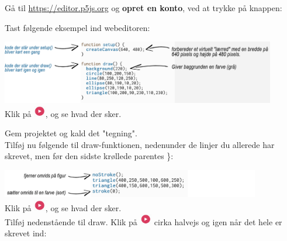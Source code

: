 \documentclass{ucph-handout}
\newcounter{handout}
\newcommand{\Ark}{Ark \#\arabic{handout} -- }
\begin{document}
\renewcommand{\Title}{\Ark Tegn med editor.p5js.org}

\begin{exercisebox}[adjusted title=Før vi rigtig starter]

Gå til \url{https://editor.p5js.org} og \textbf{opret en konto}, ved at trykke på knappen: 


\vspace{3mm}
Tast følgende eksempel ind webeditoren:

\vspace{3mm}
\quad\quad\includegraphics[width=0.90\textwidth]{nyebilleder/first.jpg} \\

Klik på \includegraphics[height=5mm]{ikoner/run.png}, og se hvad der sker. 
\vspace{3mm}

Gem projektet og kald det "tegning".\\

Tilføj nu følgende til draw-funktionen, nedenunder de linjer du allerede har skrevet, men før den sidste krøllede parentes \}:

\vspace{3mm}
\quad\includegraphics[width=0.85\textwidth]{nyebilleder/kodeeks.jpg} \\

Klik på \includegraphics[height=5mm]{ikoner/run.png}, og se hvad der sker. \\

Tilføj nedenstående til draw. Klik på \includegraphics[height=5mm]{ikoner/run.png} cirka halvejs og igen når det hele er skrevet ind:


\end{exercisebox}
\end{document}
